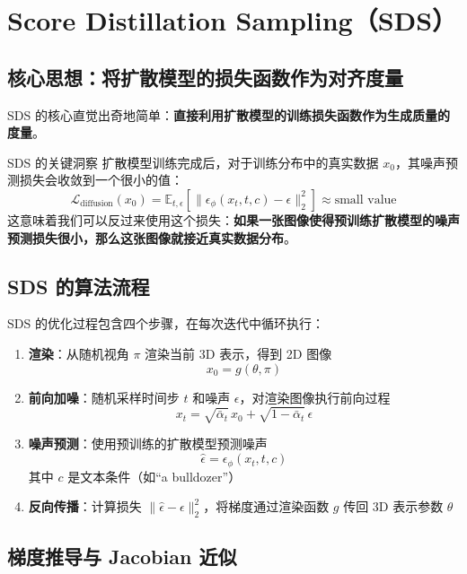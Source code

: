 \documentclass[a4paper]{article}
\begin{document}
\newpage
\section{Score Distillation Sampling（SDS）}

\subsection{核心思想：将扩散模型的损失函数作为对齐度量}

SDS 的核心直觉出奇地简单：\textbf{直接利用扩散模型的训练损失函数作为生成质量的度量}。

\begin{importantbox}{SDS 的关键洞察}
扩散模型训练完成后，对于训练分布中的真实数据 $x_0$，其噪声预测损失会收敛到一个很小的值：
$$
\mathcal{L}_{\text{diffusion}}(x_0) = \mathbb{E}_{t, \epsilon}\left[\| \epsilon_\phi(x_t, t, c) - \epsilon \|_2^2\right] \approx \text{small value}
$$
这意味着我们可以反过来使用这个损失：\textbf{如果一张图像使得预训练扩散模型的噪声预测损失很小，那么这张图像就接近真实数据分布}。
\end{importantbox}

\subsection{SDS 的算法流程}

SDS 的优化过程包含四个步骤，在每次迭代中循环执行：

\begin{enumerate}
    \item \textbf{渲染}：从随机视角 $\pi$ 渲染当前 3D 表示，得到 2D 图像
    $$x_0 = g(\theta, \pi)$$

    \item \textbf{前向加噪}：随机采样时间步 $t$ 和噪声 $\epsilon$，对渲染图像执行前向过程
    $$x_t = \sqrt{\bar{\alpha}_t}\, x_0 + \sqrt{1 - \bar{\alpha}_t}\, \epsilon$$

    \item \textbf{噪声预测}：使用预训练的扩散模型预测噪声
    $$\hat{\epsilon} = \epsilon_\phi(x_t, t, c)$$
    其中 $c$ 是文本条件（如``a bulldozer''）

    \item \textbf{反向传播}：计算损失 $\| \hat{\epsilon} - \epsilon \|_2^2$，将梯度通过渲染函数 $g$ 传回 3D 表示参数 $\theta$
\end{enumerate}

\subsection{梯度推导与 Jacobian 近似}
\end{document}
